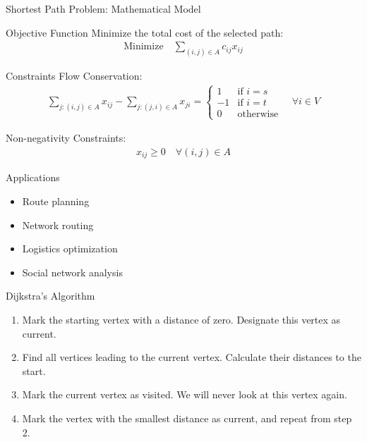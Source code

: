 \documentclass{beamer}
\begin{document}
\begin{frame}{Shortest Path Problem: Mathematical Model}
\begin{block}{Objective Function}
Minimize the total cost of the selected path:
\begin{align*}
\text{Minimize} \quad \sum_{(i,j) \in A} c_{ij} x_{ij}
\end{align*}
\end{block}

\begin{block}{Constraints}
Flow Conservation:
\begin{align*}
\sum_{j:(i,j) \in A} x_{ij} - \sum_{j:(j,i) \in A} x_{ji} = 
\begin{cases} 
1 & \text{if } i = s \\
-1 & \text{if } i = t \\
0 & \text{otherwise}
\end{cases}
\quad \forall i \in V
\end{align*}

Non-negativity Constraints:
\begin{align*}
x_{ij} 
\geq 0 \quad \forall (i,j) \in A
\end{align*}
\end{block}
\end{frame}
\begin{frame}
\begin{block}{Applications}
\begin{itemize}
\item Route planning
\item Network routing
\item Logistics optimization
\item Social network analysis
\end{itemize}
\end{block}
\end{frame}


\begin{frame}{Dijkstra's Algorithm}
\begin{enumerate}
\item Mark the starting vertex with a distance of zero. Designate this vertex as current.
\item Find all vertices leading to the current vertex. Calculate their distances to the start.
\item Mark the current vertex as visited. We will never look at this vertex again.
\item Mark the vertex with the smallest distance as current, and repeat from step 2.
\end{enumerate}
\end{frame}
\end{document}
